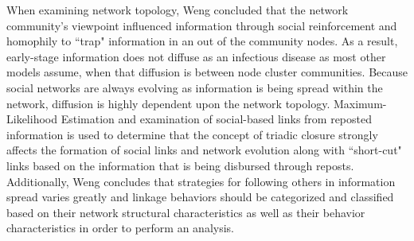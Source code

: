 When examining network topology, Weng concluded that the network community's viewpoint influenced information through social reinforcement and homophily to ``trap" information in an out of the community nodes. As a result, early-stage information does not diffuse as an infectious disease as most other models assume, when that diffusion is between node cluster communities. Because social networks are always evolving as information is being spread within the network, diffusion is highly dependent upon the network topology. Maximum-Likelihood Estimation and examination of social-based links from reposted information is used to determine that the concept of triadic closure strongly affects the formation of social links and network evolution along with ``short-cut" links based on the information that is being disbursed through reposts. Additionally, Weng concludes that strategies for following others in information spread varies greatly and linkage behaviors should be categorized and classified based on their network structural characteristics as well as their behavior characteristics in order to perform an analysis. \cite{weng2014information}


